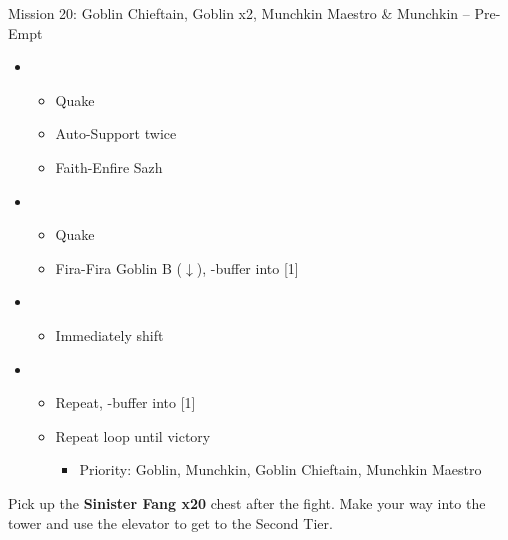 \begin{battle}{{Mission 20: Goblin Chieftain, Goblin x2, Munchkin Maestro \& Munchkin -- Pre-Empt}}
	\begin{itemize}
		\item \third
			\begin{itemize}
				\item Quake
				\item Auto-Support twice
				\item Faith-Enfire Sazh
			\end{itemize}
		\item \fifth
			\begin{itemize}
				\item Quake
				\item Fira-Fira Goblin B ($\downarrow$), \com-buffer into [1]
			\end{itemize}
		\item \first
			\begin{itemize}
				\item Immediately shift
			\end{itemize}
		\item \fifth
			\begin{itemize}
				\item Repeat, \com-buffer into [1]
				\item Repeat loop until victory
					\begin{itemize}
						\item Priority: Goblin, Munchkin, Goblin Chieftain, Munchkin Maestro
					\end{itemize}
			\end{itemize}
	\end{itemize}
\end{battle}

Pick up the \textbf{Sinister Fang x20} chest after the fight.
Make your way into the tower and use the elevator to get to the Second Tier.

